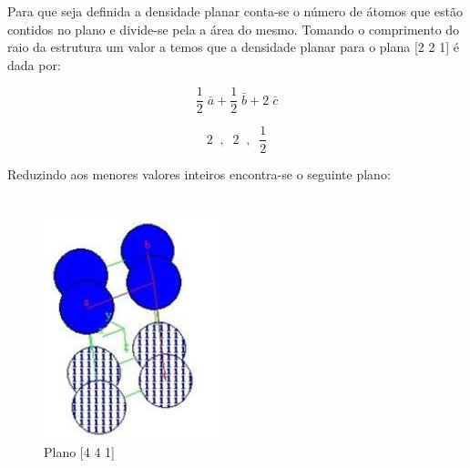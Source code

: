 \documentclass[10pt,twocolumn,letterpaper]{article}
\begin{document}
\hspace{1cm} Para que seja definida a densidade planar conta-se o número de átomos que estão contidos no plano e divide-se pela a área do mesmo. Tomando o comprimento do raio da estrutura um valor a temos que a densidade planar para o plana [2 2 1] é dada por:

\begin{equation*}
    \frac{1}{2}\;\bar{a} + \frac{1}{2}\;\bar{b} + 2\;\bar{c}
\end{equation*}



\vspace{-0.25cm}

\begin{equation*}
    2 \;\; , \;\; 2 \;\; , \;\; \frac{1}{2}
\end{equation*}

\hspace{1cm} Reduzindo aos menores valores inteiros encontra-se o seguinte plano:

\vspace{-0.75cm}

\begin{align*}
    [ \; 4 \; 4 \; 1 \;]
\end{align*}

\vspace{-0.5cm}

\begin{figure}[h]
    \centering
    \includegraphics[width=5cm]{fig5.jpg}
    \caption{Plano [4 4 1]}
    \label{fig:label}
\end{figure}
\end{document}
